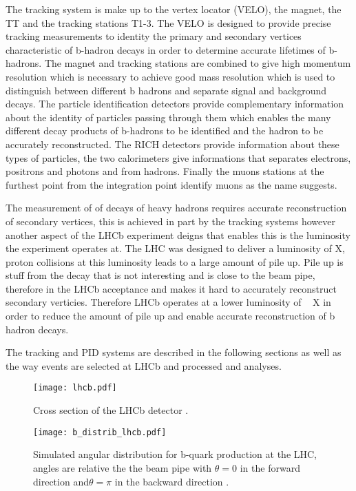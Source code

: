 The tracking system is make up to the vertex locator (VELO), the magnet, the TT and the tracking stations T1-3. The VELO is designed to provide precise tracking measurements to identity the primary and secondary vertices characteristic of b-hadron decays in order to determine accurate lifetimes of b-hadrons. The magnet and tracking stations are combined to give high momentum resolution which is necessary to achieve good mass resolution which is used to distinguish between different b hadrons and separate signal and background decays.
The particle identification detectors provide complementary information about the identity of particles passing through them which enables the many different decay products of b-hadrons to be identified and the hadron to be accurately reconstructed. The RICH detectors provide information about these types of particles, the two calorimeters give informations that separates electrons, positrons and photons and from hadrons. Finally the muons stations at the furthest point from the integration point identify muons as the name suggests. 

The measurement of of decays of heavy hadrons requires accurate reconstruction of secondary vertices, this is achieved in part by the tracking systems however another aspect of the LHCb experiment deigns that enables this is the luminosity the experiment operates at. The LHC was designed to deliver a luminosity of X, proton collisions at this luminosity leads to a large amount of pile up. Pile up is stuff from the decay that is not interesting and is close to the beam pipe, therefore in the LHCb acceptance and makes it hard to accurately reconstruct secondary verticies. Therefore LHCb operates at a lower luminosity of ~ X in order to reduce the amount of pile up and enable accurate reconstruction of b hadron decays. 

The tracking and PID systems are described in the following sections as well as the way events are selected at LHCb and processed and analyses. 



\begin{figure}[tb] 
  \centering    
  \texttt{[image: lhcb.pdf]}
  \caption{Cross section of the LHCb detector \cite{LHCb:2003ab}.}
  \label{fig:LHCb_detector}
\end{figure}




\begin{figure}[tb] 
  \centering    
  \texttt{[image: b\_distrib\_lhcb.pdf]}
  \caption{Simulated angular distribution for b-quark production at the LHC, angles are relative the the beam pipe with $\theta =0$ in the forward direction and$\theta = \pi$  in the backward direction \cite{Amato:1998xt}.}
  \label{fig:LHCb_detector}
\end{figure}


